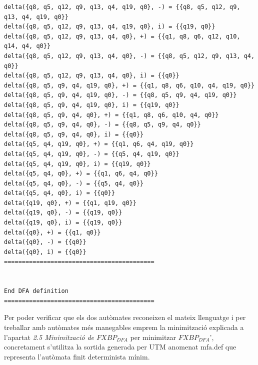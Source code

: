 \documentclass[12pt,a4paper]{report}
\def \dfa{$FXBP_{DFA} $}
\begin{document}
\begin{lstlisting}
delta({q8, q5, q12, q9, q13, q4, q19, q0}, -) = {{q8, q5, q12, q9, q13, q4, q19, q0}}
delta({q8, q5, q12, q9, q13, q4, q19, q0}, i) = {{q19, q0}}
delta({q8, q5, q12, q9, q13, q4, q0}, +) = {{q1, q8, q6, q12, q10, q14, q4, q0}}
delta({q8, q5, q12, q9, q13, q4, q0}, -) = {{q8, q5, q12, q9, q13, q4, q0}}
delta({q8, q5, q12, q9, q13, q4, q0}, i) = {{q0}}
delta({q8, q5, q9, q4, q19, q0}, +) = {{q1, q8, q6, q10, q4, q19, q0}}
delta({q8, q5, q9, q4, q19, q0}, -) = {{q8, q5, q9, q4, q19, q0}}
delta({q8, q5, q9, q4, q19, q0}, i) = {{q19, q0}}
delta({q8, q5, q9, q4, q0}, +) = {{q1, q8, q6, q10, q4, q0}}
delta({q8, q5, q9, q4, q0}, -) = {{q8, q5, q9, q4, q0}}
delta({q8, q5, q9, q4, q0}, i) = {{q0}}
delta({q5, q4, q19, q0}, +) = {{q1, q6, q4, q19, q0}}
delta({q5, q4, q19, q0}, -) = {{q5, q4, q19, q0}}
delta({q5, q4, q19, q0}, i) = {{q19, q0}}
delta({q5, q4, q0}, +) = {{q1, q6, q4, q0}}
delta({q5, q4, q0}, -) = {{q5, q4, q0}}
delta({q5, q4, q0}, i) = {{q0}}
delta({q19, q0}, +) = {{q1, q19, q0}}
delta({q19, q0}, -) = {{q19, q0}}
delta({q19, q0}, i) = {{q19, q0}}
delta({q0}, +) = {{q1, q0}}
delta({q0}, -) = {{q0}}
delta({q0}, i) = {{q0}}
==========================================


End DFA definition
==========================================

\end{lstlisting}

Per poder verificar que els dos autòmates reconeixen el mateix llenguatge i per treballar amb autòmates més manegables emprem la minimització explicada a l’apartat \textit{2.5 Minimització de \dfa{}} per minimitzar \dfa', concretament s’utilitza la sortida generada per UTM anomenat mfa.def que representa l’autòmata finit determinista mínim. 
\end{document}
